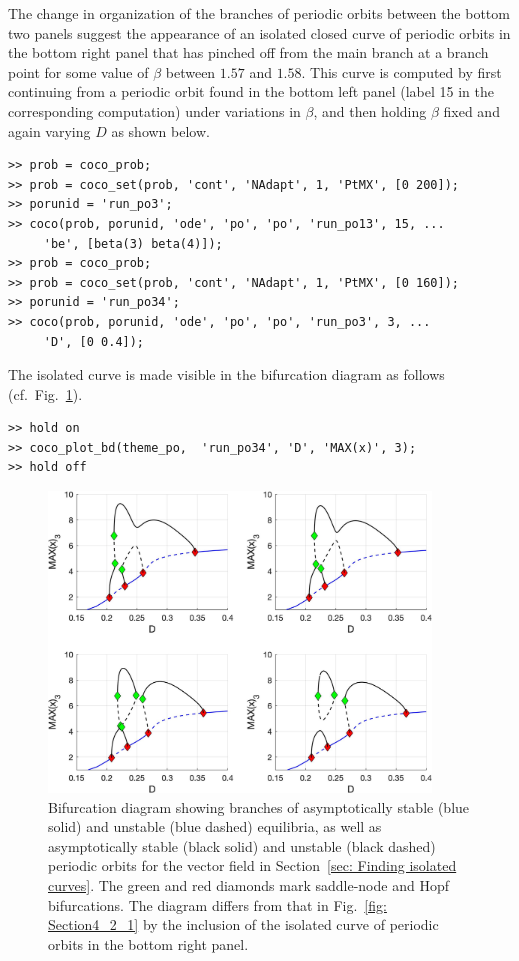 The change in organization of the branches of periodic orbits between the bottom two panels suggest the appearance of an isolated closed curve of periodic orbits in the bottom right panel that has pinched off from the main branch at a branch point for some value of $\beta$ between $1.57$ and $1.58$. This curve is computed by first continuing from a periodic orbit found in the bottom left panel (label 15 in the corresponding computation) under variations in $\beta$, and then holding $\beta$ fixed and again varying $D$ as shown below.
\begin{lstlisting}[language=coco-highlight,frame=lines]
>> prob = coco_prob;
>> prob = coco_set(prob, 'cont', 'NAdapt', 1, 'PtMX', [0 200]);
>> porunid = 'run_po3';
>> coco(prob, porunid, 'ode', 'po', 'po', 'run_po13', 15, ...
     'be', [beta(3) beta(4)]);
>> prob = coco_prob;
>> prob = coco_set(prob, 'cont', 'NAdapt', 1, 'PtMX', [0 160]);
>> porunid = 'run_po34';
>> coco(prob, porunid, 'ode', 'po', 'po', 'run_po3', 3, ...
     'D', [0 0.4]);
\end{lstlisting}
The isolated curve is made visible in the bifurcation diagram as follows (cf.\ Fig.~\ref{fig: Section4_2_2}).
\begin{lstlisting}[language=coco-highlight,frame=lines]
>> hold on
>> coco_plot_bd(theme_po,  'run_po34', 'D', 'MAX(x)', 3);
>> hold off
\end{lstlisting}
\begin{figure}[h]
\centering
\includegraphics[width=4in]{Figures/Section4_2_2.jpg}
\caption{Bifurcation diagram showing branches of asymptotically stable (blue solid) and unstable (blue dashed) equilibria, as well as asymptotically stable (black solid) and unstable (black dashed) periodic orbits for the vector field in Section~\ref{sec: Finding isolated curves}. The green and red diamonds mark saddle-node and Hopf bifurcations. The diagram differs from that in Fig.~\ref{fig: Section4_2_1} by the inclusion of the isolated curve of periodic orbits in the bottom right panel.}
\label{fig: Section4_2_2}
\end{figure}

